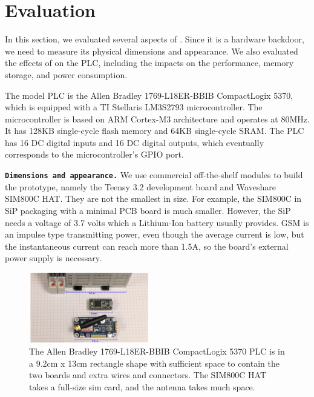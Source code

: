 \section{Evaluation}
\label{sec:implant-evaluation}

In this section, we evaluated several aspects of \name. Since it is a hardware backdoor, we need to measure its physical dimensions and appearance. We also evaluated the effects of \name on the PLC, including the impacts on the performance, memory storage, and power consumption.

The model PLC is the Allen Bradley 1769-L18ER-BBIB CompactLogix
5370, which is equipped with a TI Stellaris LM3S2793 microcontroller. The microcontroller is based on ARM Cortex-M3 architecture and operates at 80MHz. It has 128KB single-cycle flash memory and 64KB single-cycle SRAM. The PLC has 16 DC digital inputs and 16 DC digital outputs, which eventually corresponds to the microcontroller's GPIO port.

\texttt{\textbf{Dimensions and appearance.}} We use commercial off-the-shelf modules to build the prototype, namely the Teensy 3.2 development board and Waveshare SIM800C HAT. They are not the smallest in size. For example,  the SIM800C in SiP packaging with a minimal PCB board is much smaller. However, the SiP needs a voltage of 3.7 volts which a Lithium-Ion battery usually provides. GSM is an impulse type transmitting power, even though the average current is low, but the instantaneous current can reach more than 1.5A, so the board's external power supply is necessary. 

\begin{figure}[h]
	\includegraphics[width=0.47\textwidth]{figures/eval-size}
	\centering
	\caption{The Allen Bradley 1769-L18ER-BBIB CompactLogix
	5370 PLC is in a 9.2cm x 13cm rectangle shape with sufficient space to contain the two boards and extra wires and connectors. The SIM800C HAT takes a full-size sim card, and the antenna takes much space.}
	\label{fig:eval-size}
\end{figure}

